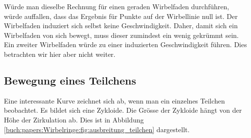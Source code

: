 Würde man dieselbe Rechnung für einen geraden Wirbelfaden durchführen, würde auffallen, dass das Ergebnis für Punkte auf der Wirbellinie null ist.
Der Wirbelfaden induziert sich selbst keine Geschwindigkeit.
Daher, damit sich ein Wirbelfaden von sich bewegt, muss dieser zumindest ein wenig gekrümmt sein.
Ein zweiter Wirbelfaden würde zu einer induzierten Geschwindigkeit führen. 
Dies betrachten wir hier aber nicht weiter. 

\subsection{Bewegung eines Teilchens}



Eine interessante Kurve zeichnet sich ab, wenn man ein einzelnes Teilchen beobachtet.
Es bildet sich eine Zykloide.
Die Grösse der Zykloide hängt von der Höhe der Zirkulation ab.
Dies ist in Abbildung \ref{buch:papers:Wirbelringe:fig:ausbreitung_teilchen} dargestellt.
